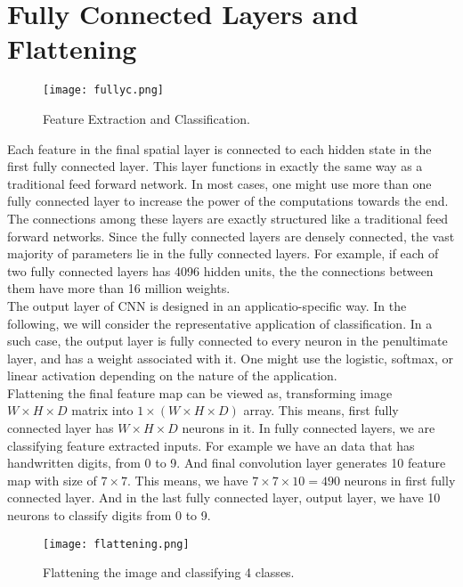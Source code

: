 \documentclass[11pt]{article}
\begin{document}
\section{Fully Connected Layers and Flattening}
\begin{figure}[H]
\centering
\texttt{[image: fullyc.png]}
\caption{Feature Extraction and Classification.}
\label{fig:figure3}
\end{figure}
Each feature in the final spatial layer is connected to each hidden state in the first fully connected layer. This layer functions in exactly the same way as a traditional feed forward network. In most cases, one might use more than one fully connected layer to increase the power of the computations towards the end. The connections among these layers are exactly structured like a traditional feed forward networks. Since the fully connected layers are densely connected, the vast majority of parameters lie in the fully connected layers. For example, if each of two fully connected layers has 4096 hidden units, the the connections between them have more than 16 million weights. \\
The output layer of CNN is designed in an applicatio-specific way. In the following, we will consider the representative application of classification. In a such case, the output layer is fully connected to every neuron in the penultimate layer, and has a weight associated with it. One might use the logistic, softmax, or linear activation depending on the nature of the application.\\
Flattening the final feature map can be viewed as, transforming image $W \times H \times D$ matrix into $ 1 \times (W \times H \times D)$ array. This means, first fully connected layer has $W \times H \times D$ neurons in it. In fully connected layers, we are classifying feature extracted inputs. For example we have an data that has handwritten digits, from 0 to 9. And final convolution layer generates 10 feature map with size of $7\times7$. This means, we have $7\times7\times10 = 490$ neurons in first fully connected layer. And in the last fully connected layer, output layer, we have 10 neurons to classify digits from 0 to 9. 

\begin{figure}[H]
\centering
\texttt{[image: flattening.png]}
\caption{Flattening the image and classifying 4 classes.}
\label{fig:figure3}
\end{figure}
\end{document}
